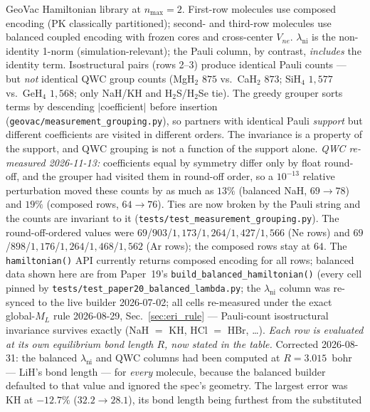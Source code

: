 \documentclass[twocolumn,pra,amsmath,amssymb,superscriptaddress]{revtex4-2}
\begin{document}
\begin{table}[h]
\caption{GeoVac Hamiltonian library at $n_{\max}=2$.  First-row
  molecules use composed encoding (PK classically partitioned);
  second- and third-row molecules use balanced coupled encoding
  with frozen cores and cross-center $V_{ne}$.
  $\lambda_{\text{ni}}$ is the non-identity 1-norm (simulation-relevant);
  the Pauli column, by contrast, \emph{includes} the identity term.
  Isostructural pairs (rows 2--3) produce identical Pauli counts --- but
  \emph{not} identical QWC group counts (MgH$_2$ $875$ vs.\ CaH$_2$ $873$;
  SiH$_4$ $1{,}577$ vs.\ GeH$_4$ $1{,}568$; only NaH/KH and H$_2$S/H$_2$Se
  tie).  The greedy grouper sorts terms by descending $|$coefficient$|$
  before insertion (\texttt{geovac/measurement\_grouping.py}), so partners
  with identical Pauli \emph{support} but different coefficients are visited
  in different orders.  The invariance is a property of the support, and QWC
  grouping is not a function of the support alone.
  \emph{QWC re-measured 2026-11-13:} coefficients equal by symmetry differ
  only by float round-off, and the grouper had visited them in round-off
  order, so a $10^{-13}$ relative perturbation moved these counts by as much
  as $13\%$ (balanced NaH, $69 \to 78$) and $19\%$ (composed rows, $64 \to 76$).  Ties are now broken by the Pauli string and the counts are
  invariant to it (\texttt{tests/test\_measurement\_grouping.py}).  The
  round-off-ordered values were $69$/$903$/$1{,}173$/$1{,}264$/$1{,}427$/$1{,}566$
  (Ne rows) and $69$/$898$/$1{,}176$/$1{,}264$/$1{,}468$/$1{,}562$ (Ar rows); the
  composed rows stay at $64$.
  The \texttt{hamiltonian()} API currently returns composed encoding
  for all rows; balanced data shown here are from Paper~19's
  \texttt{build\_balanced\_hamiltonian()} (every cell pinned by
  \texttt{tests/test\_paper20\_balanced\_lambda.py}; the
  $\lambda_{\text{ni}}$ column was re-synced to the live builder
  2026-07-02; all cells re-measured under the exact global-$M_L$ rule
  2026-08-29, Sec.~\ref{sec:eri_rule} --- Pauli-count isostructural
  invariance survives exactly (NaH $=$ KH, HCl $=$ HBr, \dots).
  \emph{Each row is evaluated at its own equilibrium bond length $R$,
  now stated in the table.}  Corrected 2026-08-31: the balanced
  $\lambda_{\text{ni}}$ and QWC columns had been computed at
  $R = 3.015$~bohr --- LiH's bond length --- for \emph{every} molecule,
  because the balanced builder defaulted to that value and ignored the
  spec's geometry.  The largest error was KH at $-12.7\%$
  ($32.2 \to 28.1$), its bond length being furthest from the substituted
}
\end{table}
\end{document}
